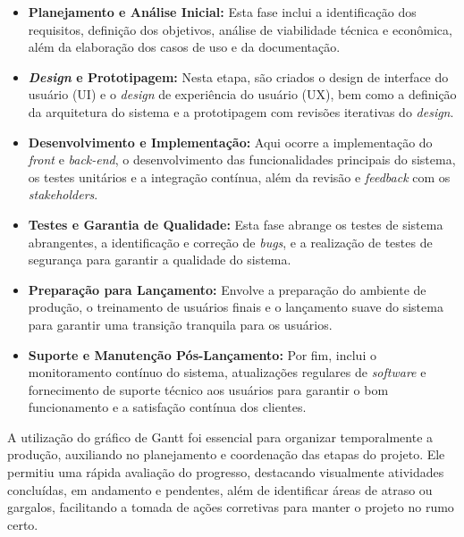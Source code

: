 \begin{itemize}
    \item \textbf{Planejamento e Análise Inicial:} Esta fase inclui a identificação dos requisitos, definição dos objetivos, análise de viabilidade técnica e econômica, além da elaboração dos casos de uso e da documentação.
    
    \item \textbf{\textit{Design} e Prototipagem:} Nesta etapa, são criados o design de interface do usuário (UI) e o \textit{design} de experiência do usuário (UX), bem como a definição da arquitetura do sistema e a prototipagem com revisões iterativas do \textit{design}.
    
    \item \textbf{Desenvolvimento e Implementação:} Aqui ocorre a implementação do \textit{front} e \textit{back-end}, o desenvolvimento das funcionalidades principais do sistema, os testes unitários e a integração contínua, além da revisão e \textit{feedback} com os \textit{stakeholders}.
    
    \item \textbf{Testes e Garantia de Qualidade:} Esta fase abrange os testes de sistema abrangentes, a identificação e correção de \textit{bugs}, e a realização de testes de segurança para garantir a qualidade do sistema.
    
    \item \textbf{Preparação para Lançamento:} Envolve a preparação do ambiente de produção, o treinamento de usuários finais e o lançamento suave do sistema para garantir uma transição tranquila para os usuários.
    
    \item \textbf{Suporte e Manutenção Pós-Lançamento:} Por fim, inclui o monitoramento contínuo do sistema, atualizações regulares de \textit{software} e fornecimento de suporte técnico aos usuários para garantir o bom funcionamento e a satisfação contínua dos clientes.
\end{itemize}

A utilização do gráfico de Gantt foi essencial para organizar temporalmente a produção, auxiliando no planejamento e coordenação das etapas do projeto. Ele permitiu uma rápida avaliação do progresso, destacando visualmente atividades concluídas, em andamento e pendentes, além de identificar áreas de atraso ou gargalos, facilitando a tomada de ações corretivas para manter o projeto no rumo certo.
        

